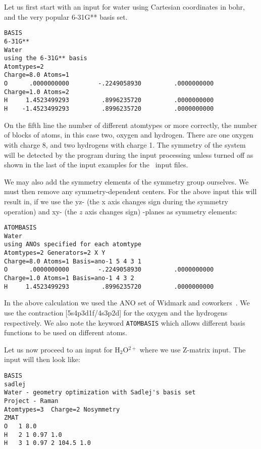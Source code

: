 Let us first start with an input for water using Cartesian coordinates
in bohr, and the very popular 6-31G** basis set.

\begin{verbatim}
BASIS
6-31G**
Water
using the 6-31G** basis
Atomtypes=2
Charge=8.0 Atoms=1
O      .0000000000        -.2249058930         .0000000000
Charge=1.0 Atoms=2
H     1.4523499293         .8996235720         .0000000000
H    -1.4523499293         .8996235720         .0000000000
\end{verbatim}

On the fifth line the number of different atomtypes or more correctly,
the number of  blocks of atoms,
in this case two, oxygen and hydrogen. There are one oxygen with
charge 8, and two hydrogens with charge 1. The symmetry of the system
will be detected by the program during the input processing unless
turned off as shown in the last of the input examples for the \mol\
input files.

We may also add the symmetry elements of the
symmetry group\index{symmetry!group} ourselves. We must
then remove any symmetry-dependent centers. For the above input this
will result in, if we use the yz- (the x axis changes sign during the
symmetry operation) and xy- (the $z$ axis changes sign) -planes as
symmetry elements: 

\begin{verbatim}
ATOMBASIS
Water
using ANOs specified for each atomtype
Atomtypes=2 Generators=2 X Y
Charge=8.0 Atoms=1 Basis=ano-1 5 4 3 1
O      .0000000000        -.2249058930         .0000000000
Charge=1.0 Atoms=1 Basis=ano-1 4 3 2
H     1.4523499293         .8996235720         .0000000000
\end{verbatim}

In the above calculation we used the ANO set of
Widmark and
coworkers~\cite{powpambortca77,powbjpbortca79}. We
use the contraction
[5s4p3d1f/4s3p2d] for the oxygen and the hydrogens respectively. We
also note the keyword \verb|ATOMBASIS|\index{ATOMBASIS} which allows
different basis
functions to be used on different atoms.

Let us now proceed to an input for H$_{2}$O$^{2+}$ where we use
Z-matrix input. The  input will then look like:

\begin{verbatim}
BASIS
sadlej
Water - geometry optimization with Sadlej's basis set
Project - Raman
Atomtypes=3  Charge=2 Nosymmetry
ZMAT
O   1 8.0
H   2 1 0.97 1.0
H   3 1 0.97 2 104.5 1.0
\end{verbatim}

